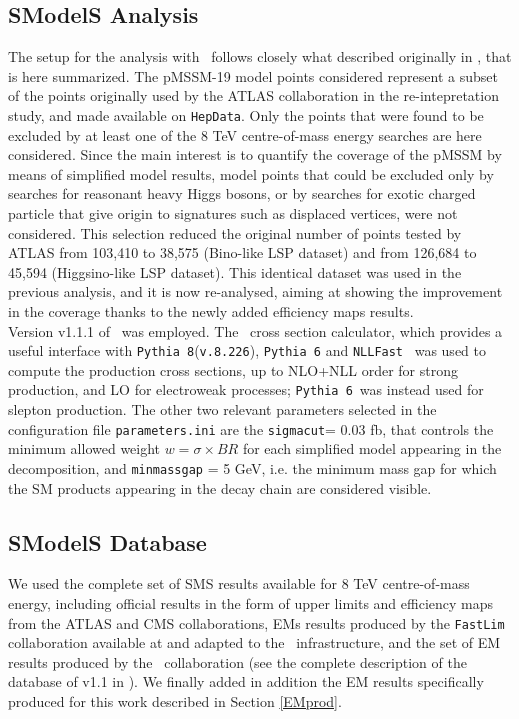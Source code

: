\documentclass[epj,nopacs,fleqn]{svjour}
\begin{document}
\subsection{SModelS Analysis}
The setup for the analysis with \SMO~follows closely what described originally in \cite{Ambrogi:2017lov}, that is here summarized. The pMSSM-19 model points considered represent a subset of the points originally used by the ATLAS collaboration in the re-intepretation study\cite{Aad:2015baa}, and made available on \texttt{HepData}\cite{ATLASpMSSMhepdata}. Only the points that were found to be excluded by at least one of the 8 TeV centre-of-mass energy searches are here considered. Since the main interest is to quantify the coverage of the pMSSM by means of simplified model results, model points that could be excluded only by searches for reasonant heavy Higgs bosons, or by searches for exotic charged particle that give origin to signatures such as displaced vertices, were not considered. 
This selection reduced the original number of points tested by ATLAS from 103,410 to 38,575 (Bino-like LSP dataset) and from 126,684 to 45,594 (Higgsino-like LSP dataset). This identical dataset was used in the previous \SMO analysis, and it is now  re-analysed, aiming at showing the improvement in the coverage thanks to the newly added efficiency maps results. 
\\
Version v1.1.1 of \SMO~was employed. The \SMO~cross section calculator, which provides a useful interface with \texttt{Pythia 8}(\texttt{v.8.226})\cite{Sjostrand:2014zea}, \texttt{Pythia 6}\cite{Sjostrand:2006za} and \texttt{NLLFast}~\cite{nllfast,Beenakker:1996ch,Kulesza:2008jb,Kulesza:2009kq,Beenakker:2009ha,Beenakker:2011fu,Beenakker:1997ut,Beenakker:2010nq} was used to compute the production cross sections, up to NLO+NLL order for strong production, and LO for electroweak processes; \texttt{Pythia 6}~was instead used for slepton production. The other two relevant parameters selected in the configuration file \texttt{parameters.ini} are the \texttt{sigmacut}= 0.03 fb, that controls the  minimum allowed weight  $w = \sigma \times BR$ for each simplified model appearing in the decomposition, and \verb|minmassgap| = 5 GeV, i.e. the minimum mass gap for which the SM products appearing in the decay chain are considered visible. 
\\
\subsection{SModelS Database}
We used the complete set of SMS results available for 8 TeV centre-of-mass energy, including official results in the form of upper limits and efficiency maps from the ATLAS and CMS collaborations, EMs results produced by the \texttt{FastLim} collaboration available at \cite{fastlim:web} and adapted to the \SMO~infrastructure, and the set of EM results produced by the \SMO~collaboration (see the complete description of the database of v1.1 in \cite{Ambrogi:2017lov}). We finally added in addition the EM results specifically produced for this work described in Section \ref{EMprod}.
\end{document}
